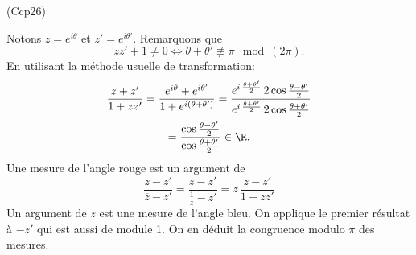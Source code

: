 \begin{tiny}(Ccp26)\end{tiny} Notons $z= e^{i \theta}$ et $z' = e^{i \theta'}$. Remarquons que 
\[
zz' + 1 \neq 0 
\Leftrightarrow
\theta + \theta' \not \equiv \pi \mod (2\pi).
\]
En utilisant la méthode usuelle de transformation:
\begin{multline*}
  \frac{z + z'}{1 + zz'}
  = \frac{e^{i \theta} + e^{i\theta'}}{1 + e^{i(\theta + \theta')}}
  = \frac{e^{i\, \frac{\theta + \theta'}{2}}\, 2 \cos \frac{\theta - \theta'}{2}}{e^{i\, \frac{\theta + \theta'}{2}}\, 2 \cos \frac{\theta + \theta'}{2}}\\
  = \frac{\cos \frac{\theta - \theta'}{2}}{\cos \frac{\theta + \theta'}{2}} \in \R.
\end{multline*}
Une mesure de l'angle rouge est un argument de
\[
  \frac{z-z'}{\overline{z}-z'}
  = \frac{z-z'}{\frac{1}{z}-z'}
  = z\, \frac{z - z' }{1-zz'}
\]
Un argument de $z$ est une mesure de l'angle bleu. On applique le premier résultat à $-z'$ qui est aussi de module 1. On en déduit la congruence modulo $\pi$ des mesures.
